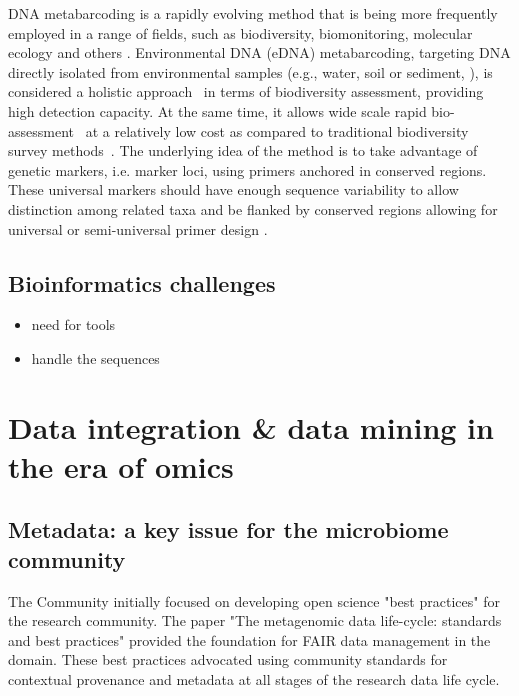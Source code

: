    DNA metabarcoding is a rapidly evolving method that is being more frequently employed 
   in a range of fields, such as biodiversity, biomonitoring, molecular ecology and others 
   \citep{deiner2017environmental, ruppert2019past}. 
   Environmental DNA (eDNA) metabarcoding, targeting DNA directly isolated from environmental samples 
   (e.g., water, soil or sediment, \citep{taberlet2012environmental}), is considered a holistic 
   approach~\citep{stat2017ecosystem} in terms of biodiversity assessment, providing high detection capacity. 
   At the same time, it allows wide scale rapid bio-assessment~\citep{stat2017ecosystem} 
   at a relatively low cost as compared to traditional biodiversity survey methods~\citep{ji2013reliable}. 
   The underlying idea of the method is to take advantage of genetic markers, i.e. marker loci, using primers anchored in conserved regions. 
   These universal markers should have enough sequence variability to allow distinction among related taxa and be flanked by conserved regions allowing for universal or semi-universal primer design \citep{deagle2014dna}. 
   \fi




\subsection{Bioinformatics challenges}


   \begin{itemize}
      \item need for tools 
      \item handle the sequences 
   \end{itemize}




\section{Data integration \& data mining in the era of omics}


\subsection{Metadata: a key issue for the microbiome community}

   The Community initially focused on developing open science "best practices" for the research community. 
   The paper "The metagenomic data life-cycle: standards and best practices" \citep{ten2017metagenomic} provided the foundation for FAIR data management in the domain. 
   These best practices advocated using community standards for contextual provenance and metadata at all stages of the research data life cycle.

